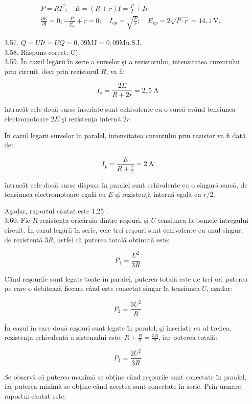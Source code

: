 \documentclass[10pt]{article}
\begin{document}
$$
\begin{aligned}
& P=R I^{2} ; \quad E=(R+r) I=\frac{P}{I}+I r \\
& \frac{\partial E}{\partial \mathrm{I}}=0 ;-\frac{P}{I_{o p}^{2}}+r=0 ; \quad I_{o p}=\sqrt{\frac{P}{r}} ; \quad E_{o p}=2 \sqrt{P \cdot r}=14,1 \mathrm{~V} .
\end{aligned}
$$

3.57. $Q=U I t=U Q=0,09 \mathrm{MJ}=0,09 \mathrm{Mu} . \mathrm{S} . \mathrm{I}$.\\
3.58. Răspuns corect: C).\\
3.59. În cazul legării în serie a surselor şi a rezistorului, intensitatea curentului prin circuit, deci prin rezistorul $R$, va fi:

$$
I_{s}=\frac{2 E}{R+2 r}=2,5 \mathrm{~A}
$$

întrucât cele două surse înseriate sunt echivalente cu o sursă având tensiunea electromotoare $2 E$ şi rezistenţa internă $2 r$.

În cazul legarii surselor în paralel, intensitatea curentului prin rezistor va fi dată de:

$$
I_{p}=\frac{E}{R+\frac{r}{2}}=2 \mathrm{~A}
$$

întrucât cele două surse dispuse în paralel sunt echivalente cu o singură sursă, de tensiunea electromotoare egală cu $E$ şi rezistență internă egală cu $r / 2$.

Aşadar, raportul căutat este 1,25 .\\
3.60. Fie $R$ rezistența oricăruia dintre reşouri, şi $U$ tensiunea la bomele întregului circuit. În cazul legării în serie, cele trei reşouri sunt echivalente cu unul singur, de rezistentă $3 R$, astfel că puterea totală obținută este:

$$
P_{1}=\frac{U^{2}}{3 R}
$$

Când reşourile sunt legate toate în paralel, puterea totală este de trei ori puterea pe care o debitează fiecare când este conectat singur la tensiunea $U$, aşadar:

$$
P_{2}=\frac{3 U^{2}}{R}
$$

În cazul în care două reşouri sunt legate în paralel, şi înseriate cu al treilea, rezistența echivalentă a sistemului este: $R+\frac{R}{2}=\frac{3 R}{2}$, iar puterea totală:

$$
P_{3}=\frac{2 U^{2}}{3 R}
$$

Se observă că puterea maximă se obține când reşourile sunt conectate în paralel, iar puterea minimă se obține când acestea sunt conectate în serie. Prin urmare, raportul căutat este:
\end{document}
